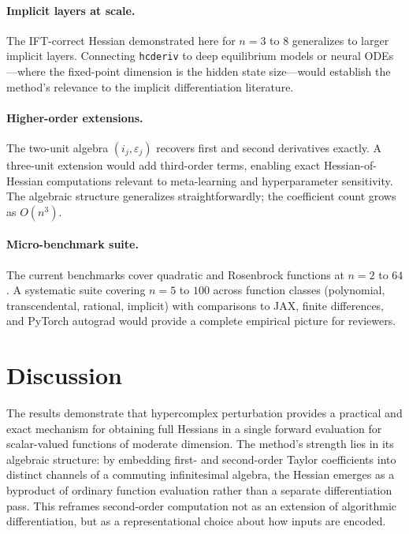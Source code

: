 \paragraph{Implicit layers at scale.}
The IFT-correct Hessian demonstrated here for $n = 3$ to $8$ generalizes to larger
implicit layers. Connecting \texttt{hcderiv} to deep equilibrium models
\citep{bai2019} or neural ODEs \citep{chen2018}---where the fixed-point dimension is
the hidden state size---would establish the method's relevance to the implicit
differentiation literature.

\paragraph{Higher-order extensions.}
The two-unit algebra $(i_j, \varepsilon_j)$ recovers first and second derivatives
exactly. A three-unit extension would add third-order terms, enabling exact
Hessian-of-Hessian computations relevant to meta-learning and hyperparameter
sensitivity. The algebraic structure generalizes straightforwardly; the coefficient
count grows as $O(n^3)$.

\paragraph{Micro-benchmark suite.}
The current benchmarks cover quadratic and Rosenbrock functions at $n = 2$ to $64$.
A systematic suite covering $n = 5$ to $100$ across function classes (polynomial,
transcendental, rational, implicit) with comparisons to JAX, finite differences, and
PyTorch autograd would provide a complete empirical picture for reviewers.



\section{Discussion}

The results demonstrate that hypercomplex perturbation provides a practical and exact
mechanism for obtaining full Hessians in a single forward evaluation for scalar-valued
functions of moderate dimension. The method's strength lies in its algebraic
structure: by embedding first- and second-order Taylor coefficients into distinct
channels of a commuting infinitesimal algebra, the Hessian emerges as a byproduct of
ordinary function evaluation rather than a separate differentiation pass. This
reframes second-order computation not as an extension of algorithmic differentiation,
but as a representational choice about how inputs are encoded.

